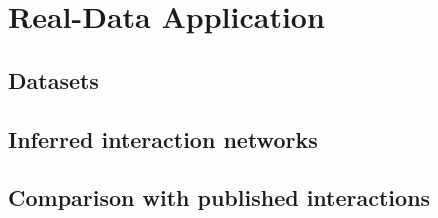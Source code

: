 \section{Real-Data Application}
\label{sec:realdata}

\subsection{Datasets}
\label{sec:real:data}

\subsection{Inferred interaction networks}
\label{sec:real:network}

\subsection{Comparison with published interactions}
\label{sec:real:validation}
